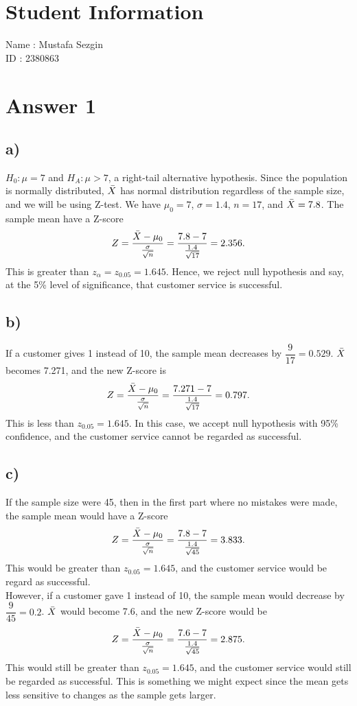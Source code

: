 \documentclass[12pt]{article}
\begin{document}
\section*{Student Information}

Name : Mustafa Sezgin \\

ID : 2380863 \\


\section*{Answer 1}
\subsection*{a)}
\noindent $H_0: \mu = 7$ and $H_A: \mu > 7$, a right-tail alternative hypothesis. Since the population is normally distributed, $\Bar{X}$ has normal distribution regardless of the sample size, and we will be using Z-test. We have $\mu_0 = 7$, $\sigma = 1.4$, $n = 17$, and $\Bar{X} = 7.8$. The sample mean have a Z-score
\[ Z = \frac{\Bar{X} - \mu_0}{\frac{\sigma}{\sqrt{n}}} = \frac{7.8 - 7}{\frac{1.4}{\sqrt{17}}} = 2.356. \]
This is greater than $z_{\alpha} = z_{0.05} = 1.645$. Hence, we reject null hypothesis and say, at the 5\% level of significance, that customer service is successful.

\subsection*{b)}
\noindent If a customer gives 1 instead of 10, the sample mean decreases by $\dfrac{9}{17} = 0.529$. $\Bar{X}$ becomes 7.271, and the new Z-score is
\[ Z = \frac{\Bar{X} - \mu_0}{\frac{\sigma}{\sqrt{n}}} = \frac{7.271 - 7}{\frac{1.4}{\sqrt{17}}} = 0.797. \]
This is less than $z_{0.05} = 1.645$. In this case, we accept null hypothesis with 95\% confidence, and the customer service cannot be regarded as successful.

\subsection*{c)}
\noindent If the sample size were 45, then in the first part where no mistakes were made, the sample mean would have a Z-score
\[ Z = \frac{\Bar{X} - \mu_0}{\frac{\sigma}{\sqrt{n}}} = \frac{7.8 - 7}{\frac{1.4}{\sqrt{45}}} = 3.833. \]
This would be greater than $z_{0.05} = 1.645$, and the customer service would be regard as successful. \vspace{2mm} \\
However, if a customer gave 1 instead of 10, the sample mean would decrease by $\dfrac{9}{45} = 0.2$. $\Bar{X}$ would become 7.6, and the new Z-score would be
\[ Z = \frac{\Bar{X} - \mu_0}{\frac{\sigma}{\sqrt{n}}} = \frac{7.6 - 7}{\frac{1.4}{\sqrt{45}}} = 2.875. \]
This would still be greater than $z_{0.05} = 1.645$, and the customer service would still be regarded as successful. This is something we might expect since the mean gets less sensitive to changes as the sample gets larger.
\end{document}
